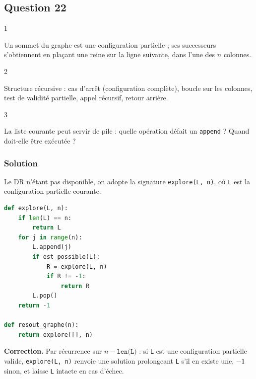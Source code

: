 \documentclass[11pt,a4paper]{article}
\begin{document}
\hypertarget{question-22}{%
\subsection{Question 22}\label{question-22}}

\begin{indication}{1}

Un sommet du graphe est une configuration partielle ; ses successeurs s'obtiennent en plaçant une reine sur la ligne suivante, dans l'une des \(n\) colonnes.

\end{indication}

\begin{indication}{2}

Structure récursive : cas d'arrêt (configuration complète), boucle sur les colonnes, test de validité partielle, appel récursif, retour arrière.

\end{indication}

\begin{indication}{3}

La liste courante peut servir de pile : quelle opération défait un \texttt{append} ? Quand doit-elle être exécutée ?

\end{indication}

\hypertarget{solution-21}{%
\subsubsection{Solution}\label{solution-21}}

Le DR n'étant pas disponible, on adopte la signature \texttt{explore(L,\ n)}, où \texttt{L} est la configuration partielle courante.

\begin{lstlisting}[language=Python]
def explore(L, n):
    if len(L) == n:
        return L
    for j in range(n):
        L.append(j)
        if est_possible(L):
            R = explore(L, n)
            if R != -1:
                return R
        L.pop()
    return -1

def resout_graphe(n):
    return explore([], n)
\end{lstlisting}

\textbf{Correction.} Par récurrence sur \(n - \texttt{len(L)}\) : si \texttt{L} est une configuration partielle valide, \texttt{explore(L,\ n)} renvoie une solution prolongeant \texttt{L} s'il en existe une, \(-1\) sinon, et laisse \texttt{L} intacte en cas d'échec.
\end{document}

